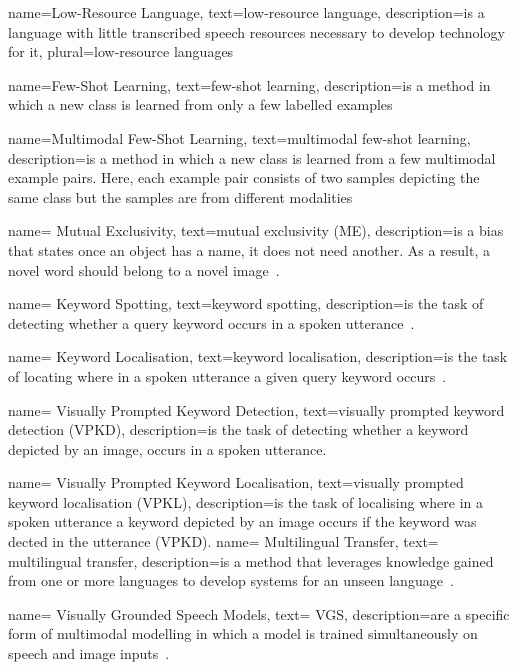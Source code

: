 {
	name=Low-Resource Language,
	text=low-resource language,
	description={is a language with little transcribed speech resources necessary to develop technology for it},
	plural=low-resource languages
}

{
	name=Few-Shot Learning,
	text=few-shot learning,
	description={is a method in which a new class is learned from only a few labelled examples~\citep{li_fei-fei_bayesian_2003, fei-fei_one-shot_2006, lake_one_2011, lake_one-shot_2014, koch_siamese_2015, vinyals_matching_2016, shyam_attentive_2017, snell_prototypical_2017}}
}

{
	name=Multimodal Few-Shot Learning,
	text=multimodal few-shot learning,
	description={is a method in which a new class is learned from a few multimodal example pairs. Here, each example pair consists of two samples depicting the same class but the samples are from different modalities~\cite{nortje_direct_2020}}
}

{
	name= Mutual Exclusivity,
	text=mutual exclusivity (ME),
	description={is a bias that states once an object has a name, it does not need another. As a result, a novel word should belong to a novel image~\citep{markman_childrens_1988}.}
}

{
	name= Keyword Spotting,
	text=keyword spotting,
	description={is the task of detecting whether a query keyword occurs in a spoken utterance~\citep{wilpon_automatic_1990}.}
}

{
	name= Keyword Localisation,
	text=keyword localisation,
	description={is the task of locating where in a spoken utterance a given query keyword occurs~\citep{olaleye_attention-based_2021}.}
}

{
	name= Visually Prompted Keyword Detection,
	text=visually prompted keyword detection (VPKD),
	description={is the task of detecting whether a keyword depicted by an image, occurs in a spoken utterance.}
}

{
	name= Visually Prompted Keyword Localisation,
	text=visually prompted keyword localisation (VPKL),
	description={is the task of localising where in a spoken utterance a keyword depicted by an image occurs if the keyword was dected in the utterance (VPKD).}
}
{
	name= Multilingual Transfer,
	text= multilingual transfer,
	description={is a method that leverages knowledge gained from one or more languages to develop systems for an unseen language~\citep{kamper_improved_2021, hu_multilingual_2020, jacobs_acoustic_2021, kamper_multilingual_2020, ma_acoustic_2021, wang_extending_2020, hermann_multilingual_2021}.}
}

{
	name= Visually Grounded Speech Models,
	text= \ac{VGS},
	description={are a specific form of multimodal modelling in which a model is trained simultaneously on speech and image inputs~\citep{harwath_deep_2015, kamper_visually_2017, chrupala_representations_2017}.}
}
